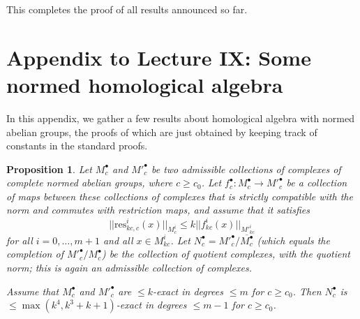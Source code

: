 \documentclass[11pt]{amsart}
\numberwithin{equation}{section}
\numberwithin{theorem}{section}
\newtheorem{proposition}[theorem]{Proposition}
\theoremstyle{definition}
\begin{document}
This completes the proof of all results announced so far.

\newpage

\section*{Appendix to Lecture IX: Some normed homological algebra}

In this appendix, we gather a few results about homological algebra with normed abelian groups, the proofs of which are just obtained by keeping track of constants in the standard proofs.


\begin{proposition}\label{prop:snakelemma} Let $M^\bullet_c$ and $M'^\bullet_c$ be two admissible collections of complexes of complete normed abelian groups, where $c\geq c_0$. Let $f^\bullet_c: M^\bullet_c\to M'^\bullet_c$ be a collection of maps between these collections of complexes that is strictly compatible with the norm and commutes with restriction maps, and assume that it satisfies
\[
||\mathrm{res}^i_{kc,c}(x)||_{M^i_c}\leq k||f^i_{kc}(x)||_{M'^i_{kc}}
\]
for all $i=0,\ldots,m+1$ and all $x\in M^i_{kc}$. Let $N^\bullet_c=M'^\bullet_c/\overline{M^\bullet_c}$ (which equals the completion of $M'^{\bullet}_c/M^\bullet_c$) be the collection of quotient complexes, with the quotient norm; this is again an admissible collection of complexes.

Assume that $M^\bullet_c$ and $M'^\bullet_c$ are $\leq k$-exact in degrees $\leq m$ for $c\geq c_0$. Then $N^\bullet_c$ is $\leq \max(k^4,k^3+k+1)$-exact in degrees $\leq m-1$ for $c\geq c_0$.
\end{proposition}
\end{document}
